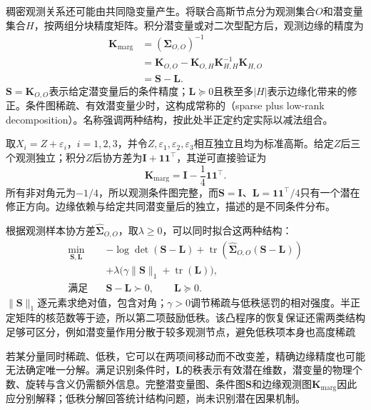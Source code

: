 稠密观测关系还可能由共同隐变量产生。将联合高斯节点分为观测集合$O$和潜变量集合$H$，按两组分块精度矩阵。积分潜变量或对二次型配方后，观测边缘的精度为
\begin{equation}
  \begin{aligned}
    \bm{K}_{\mathrm{marg}}
      &=(\bm{\Sigma}_{O,O})^{-1}\\
      &=\bm{K}_{O,O}
        -\bm{K}_{O,H}\bm{K}_{H,H}^{-1}\bm{K}_{H,O}\\
      &=\bm{S}-\bm{L}.
  \end{aligned}
  \label{eq:pgm-structure-learning-schur}
\end{equation}
$\bm{S}=\bm{K}_{O,O}$表示给定潜变量后的条件精度；$\bm{L}\succeq0$且秩至多$|H|$表示边缘化带来的修正。条件图稀疏、有效潜变量少时，这构成常称的（sparse plus low-rank decomposition）。名称强调两种结构，按此处半正定约定实际以减法组合。

取$X_i=Z+\varepsilon_i$，$i=1,2,3$，并令$Z,\varepsilon_1,\varepsilon_2,\varepsilon_3$相互独立且均为标准高斯。给定$Z$后三个观测独立；积分$Z$后协方差为$\bm{I}+\bm{1}\bm{1}^{\top}$，其逆可直接验证为
\[
  \bm{K}_{\mathrm{marg}}
  =\bm{I}-\frac14\bm{1}\bm{1}^{\top}.
\]
所有非对角元为$-1/4$，所以观测条件图完整，而$\bm{S}=\bm{I}$、$\bm{L}=\bm{1}\bm{1}^{\top}/4$只有一个潜在修正方向。边缘依赖与给定共同潜变量后的独立，描述的是不同条件分布。

根据观测样本协方差$\widehat{\bm{\Sigma}}_{O,O}$，取$\lambda\geq0$，可以同时拟合这两种结构：
\begin{equation}
  \begin{aligned}
    \min_{\bm{S},\bm{L}}\quad&
      -\log\det(\bm{S}-\bm{L})
      +\operatorname{tr}\!\left(
           \widehat{\bm{\Sigma}}_{O,O}(\bm{S}-\bm{L})\right)\\
      &+\lambda\bigl(\gamma\lVert\bm{S}\rVert_1
                      +\operatorname{tr}(\bm{L})\bigr),\\
    \text{满足}\quad&\bm{S}-\bm{L}\succ0,\qquad \bm{L}\succeq0.
  \end{aligned}
  \label{eq:pgm-structure-learning-sparse-low-rank}
\end{equation}
$\lVert\bm{S}\rVert_1$逐元素求绝对值，包含对角；$\gamma>0$调节稀疏与低秩惩罚的相对强度。半正定矩阵的核范数等于迹，所以第二项鼓励低秩。该凸程序的恢复保证还需两类结构足够可区分，例如潜变量作用分散于较多观测节点，避免低秩项本身也高度稀疏

若某分量同时稀疏、低秩，它可以在两项间移动而不改变差，精确边缘精度也可能无法确定唯一分解。满足识别条件时，$\bm{L}$的秩表示有效潜在维数，潜变量的物理个数、旋转与含义仍需额外信息。完整潜变量图、条件图$\bm{S}$和边缘观测图$\bm{K}_{\mathrm{marg}}$因此应分别解释；低秩分解回答统计结构问题，尚未识别潜在因果机制。


